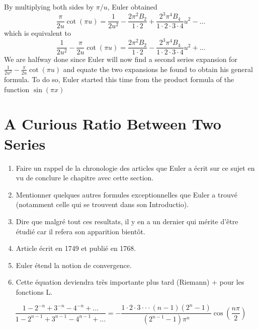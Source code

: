 By multiplying both sides by $\pi/u$, Euler obtained
$$\frac{\pi}{2u}\cot(\pi u) = \frac{1}{2 u^2} - \frac{2 \pi^2 B_2}{1\cdot 2} + \frac{2^3 \pi^4 B_4}{1\cdot 2 \cdot 3 \cdot 4}u^2 - ...$$
which is equivalent to
\begin{equation}
    \frac{1}{2 u^2} - \frac{\pi}{2u}\cot(\pi u) = \frac{2 \pi^2 B_2}{1\cdot 2} - \frac{2^3 \pi^4 B_4}{1\cdot 2 \cdot 3 \cdot 4}u^2 + ...
\end{equation}
We are halfway done since Euler will now find a second series expansion for $\frac{1}{2 u^2} - \frac{\pi}{2u}\cot(\pi u)$ and equate the two expansions he found to obtain his general formula. To do so, Euler started this time from the product formula of the function $\sin(\pi x)$ \td 

\td 

\section{A Curious Ratio Between Two Series}

\td

\begin{enumerate}
    \item Faire un rappel de la chronologie des articles que Euler a écrit sur ce sujet en vu de conclure le chapitre avec cette section.
    \item Mentionner quelques autres formules exceptionnelles que Euler a trouvé (notamment celle qui se trouvent dans son Introductio).
    \item Dire que malgré tout ces resultats, il y en a un dernier qui mérite d'être étudié car il refera son apparition bientôt.
    \item Article écrit en 1749 et publié en 1768.
    \item Euler étend la notion de convergence.
    \item Cette équation deviendra très importante plus tard (Riemann) + pour les fonctions L.
\end{enumerate}

$$\frac{1 - 2^{-n} + 3^{-n} - 4^{-n} + \dots }{1 - 2^{n-1} + 3^{n-1} - 4^{n-1} + \dots } = - \frac{1\cdot 2 \cdot 3 \cdot \cdot \cdot (n-1)(2^n-1)}{(2^{n-1} - 1) \pi^n}\cos \left(\frac{n \pi}{2}\right)$$
\td 